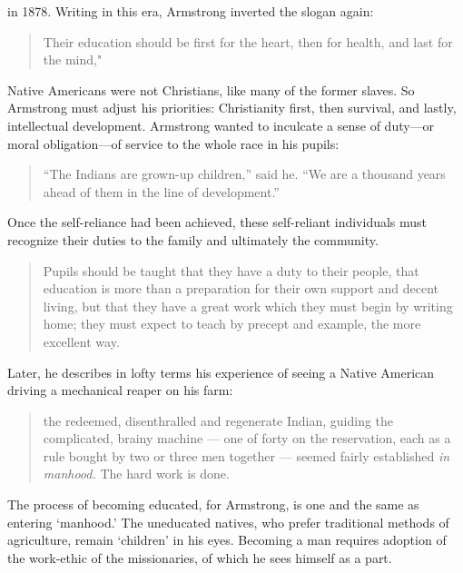  in 1878. Writing in this era, Armstrong inverted the slogan again:

\begin{quote}

Their education should be first for the heart, then for health, and last for the mind," ~\citep[p. 276--277]{Armstrong:2016ww}
\end{quote}

Native Americans were not Christians, like many of the former slaves. So Armstrong must adjust his priorities: Christianity first, then survival, and lastly, intellectual development. Armstrong wanted to inculcate a sense of duty---or moral obligation---of service to the whole race in his pupils:

\begin{quote}

``The Indians are grown-up children,'' said he. ``We
are a thousand years ahead of them in the line of
development.'' ~\citep[Quoted on p. 277]{Armstrong:2016ww}
\end{quote}

Once the self-reliance had been achieved, these self-reliant individuals must recognize their duties to the family and ultimately the community.

\begin{quote}

Pupils should be taught that they have a duty to
their people, that education is more than a preparation
for their own support and decent living, but that they
have a great work which they must begin by writing
home; they must expect to teach by precept and
example, the more excellent way.
\end{quote}

Later, he describes in lofty terms his experience of seeing a Native American driving a mechanical reaper on his farm:

\begin{quote}

the redeemed, disenthralled and regenerate Indian, guiding the complicated, brainy machine --- one of forty on the reservation, each as a rule bought by two or three men together --- seemed fairly established \emph{in manhood.} The hard
work is done.~\citep[p. 283, italics mine]{Armstrong:2016ww}
\end{quote}

The process of becoming educated, for Armstrong, is one and the same as entering `manhood.' The uneducated natives, who prefer traditional methods of agriculture, remain `children' in his eyes. Becoming a man requires adoption of the work-ethic of the missionaries, of which he sees himself as a part.

